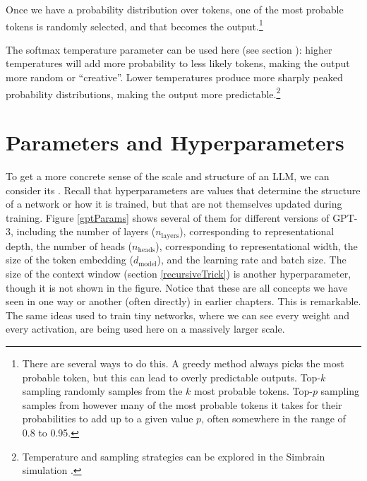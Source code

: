 Once we have a probability distribution over tokens, one of the most probable
tokens is randomly selected, and that becomes the output.\footnote{There are
several ways to do this. A greedy method always picks the most probable token,
but this can lead to overly predictable outputs. Top-$k$ sampling randomly
samples from the $k$ most probable tokens. Top-$p$ sampling samples from
however many of the most probable tokens it takes for their probabilities to
add up to a given value $p$, often somewhere in the range of 0.8 to 0.95.}

The softmax temperature parameter can be used here (see section
): higher temperatures will add more probability to less likely tokens, making the output more
random or ``creative''.  Lower temperatures produce more sharply peaked probability distributions, making the output more predictable.\footnote{Temperature and sampling strategies can be explored in the Simbrain simulation .}

\section{Parameters and Hyperparameters}

To get a more concrete sense of the scale and structure of an LLM, we can
consider its . Recall that hyperparameters are values
that determine the structure of a network or how it is trained, but that are
not themselves updated during training. Figure \ref{gptParams} shows several of
them for different versions of GPT-3, including the number of layers
($n_\text{layers}$), corresponding to representational depth, the number of
heads ($n_\text{heads}$), corresponding to representational width, the size of
the token embedding ($d_\text{model}$), and the learning rate and batch size.
The size of the context window (section \ref{recursiveTrick}) is another
hyperparameter, though it is not shown in the figure. Notice that these are all concepts we have seen in one way or another (often
directly) in earlier chapters. This is remarkable. The same ideas used to train
tiny networks, where we can see every weight and every activation, are being
used here on a massively larger scale.

